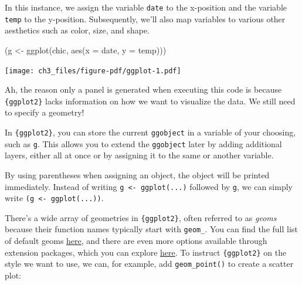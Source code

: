 \documentclass[
  letterpaper,
]{scrbook}
\newenvironment{Shaded}{\begin{snugshade}}{\end{snugshade}}
\newcommand{\AttributeTok}[1]{\textcolor[rgb]{0.40,0.45,0.13}{#1}}
\newcommand{\FunctionTok}[1]{\textcolor[rgb]{0.28,0.35,0.67}{#1}}
\newcommand{\NormalTok}[1]{\textcolor[rgb]{0.00,0.23,0.31}{#1}}
\newcommand{\OtherTok}[1]{\textcolor[rgb]{0.00,0.23,0.31}{#1}}
\begin{document}
In this instance, we assign the variable \texttt{date} to the x-position
and the variable \texttt{temp} to the y-position. Subsequently, we'll
also map variables to various other aesthetics such as color, size, and
shape.

\begin{Shaded}
\begin{Highlighting}[]
\NormalTok{(g }\OtherTok{\textless{}{-}} \FunctionTok{ggplot}\NormalTok{(chic, }\FunctionTok{aes}\NormalTok{(}\AttributeTok{x =}\NormalTok{ date, }\AttributeTok{y =}\NormalTok{ temp)))}
\end{Highlighting}
\end{Shaded}

\texttt{[image: ch3\_files/figure-pdf/ggplot-1.pdf]}

Ah, the reason only a panel is generated when executing this code is
because \texttt{\{ggplot2\}} lacks information on how we want to
visualize the data. We still need to specify a geometry!

In \texttt{\{ggplot2\}}, you can store the current \texttt{ggobject} in
a variable of your choosing, such as \texttt{g}. This allows you to
extend the \texttt{ggobject} later by adding additional layers, either
all at once or by assigning it to the same or another variable.

\begin{tcolorbox}[enhanced jigsaw, toprule=.15mm, bottomtitle=1mm, coltitle=black, breakable, colbacktitle=quarto-callout-tip-color!10!white, opacityback=0, toptitle=1mm, colframe=quarto-callout-tip-color-frame, titlerule=0mm, title=\textcolor{quarto-callout-tip-color}{\faLightbulb}\hspace{0.5em}{A Quick Tip!}, bottomrule=.15mm, arc=.35mm, opacitybacktitle=0.6, leftrule=.75mm, left=2mm, rightrule=.15mm, colback=white]

By using parentheses when assigning an object, the object will be
printed immediately. Instead of writing
\texttt{g\ \textless{}-\ ggplot(...)} followed by \texttt{g}, we can
simply write \texttt{(g\ \textless{}-\ ggplot(...))}.

\end{tcolorbox}

There's a wide array of geometries in \texttt{\{ggplot2\}}, often
referred to as \emph{geoms} because their function names typically start
with \texttt{geom\_}. You can find the full list of default geoms
\href{https://ggplot2.tidyverse.org/reference/}{here}, and there are
even more options available through extension packages, which you can
explore \href{https://exts.ggplot2.tidyverse.org/}{here}. To instruct
\texttt{\{ggplot2\}} on the style we want to use, we can, for example,
add \texttt{geom\_point()} to create a scatter plot:
\end{document}
